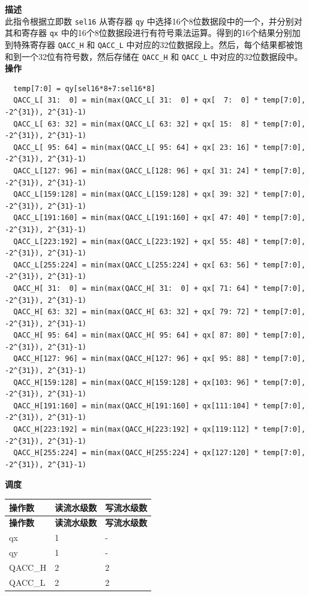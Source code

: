 \textbf{描述}\\
此指令根据立即数 \lstinline{sel16} 从寄存器 \lstinline{qy} 中选择16个8位数据段中的一个，并分别对其和寄存器 \lstinline{qx} 中的16个8位数据段进行有符号乘法运算。得到的16个结果分别加到特殊寄存器 \lstinline{QACC_H} 和 \lstinline{QACC_L} 中对应的32位数据段上。然后，每个结果都被饱和到一个32位有符号数，然后存储在 \lstinline{QACC_H} 和 \lstinline{QACC_L} 中对应的32位数据段中。\\
\textbf{操作}
\begin{lstlisting}
  temp[7:0] = qy[sel16*8+7:sel16*8]
  QACC_L[ 31:  0] = min(max(QACC_L[ 31:  0] + qx[  7:  0] * temp[7:0], -2^{31}), 2^{31}-1)
  QACC_L[ 63: 32] = min(max(QACC_L[ 63: 32] + qx[ 15:  8] * temp[7:0], -2^{31}), 2^{31}-1)
  QACC_L[ 95: 64] = min(max(QACC_L[ 95: 64] + qx[ 23: 16] * temp[7:0], -2^{31}), 2^{31}-1)
  QACC_L[127: 96] = min(max(QACC_L[128: 96] + qx[ 31: 24] * temp[7:0], -2^{31}), 2^{31}-1)
  QACC_L[159:128] = min(max(QACC_L[159:128] + qx[ 39: 32] * temp[7:0], -2^{31}), 2^{31}-1)
  QACC_L[191:160] = min(max(QACC_L[191:160] + qx[ 47: 40] * temp[7:0], -2^{31}), 2^{31}-1)
  QACC_L[223:192] = min(max(QACC_L[223:192] + qx[ 55: 48] * temp[7:0], -2^{31}), 2^{31}-1)
  QACC_L[255:224] = min(max(QACC_L[255:224] + qx[ 63: 56] * temp[7:0], -2^{31}), 2^{31}-1)
  QACC_H[ 31:  0] = min(max(QACC_H[ 31:  0] + qx[ 71: 64] * temp[7:0], -2^{31}), 2^{31}-1)
  QACC_H[ 63: 32] = min(max(QACC_H[ 63: 32] + qx[ 79: 72] * temp[7:0], -2^{31}), 2^{31}-1)
  QACC_H[ 95: 64] = min(max(QACC_H[ 95: 64] + qx[ 87: 80] * temp[7:0], -2^{31}), 2^{31}-1)
  QACC_H[127: 96] = min(max(QACC_H[127: 96] + qx[ 95: 88] * temp[7:0], -2^{31}), 2^{31}-1)
  QACC_H[159:128] = min(max(QACC_H[159:128] + qx[103: 96] * temp[7:0], -2^{31}), 2^{31}-1)
  QACC_H[191:160] = min(max(QACC_H[191:160] + qx[111:104] * temp[7:0], -2^{31}), 2^{31}-1)
  QACC_H[223:192] = min(max(QACC_H[223:192] + qx[119:112] * temp[7:0], -2^{31}), 2^{31}-1)
  QACC_H[255:224] = min(max(QACC_H[255:224] + qx[127:120] * temp[7:0], -2^{31}), 2^{31}-1)

\end{lstlisting}

\textbf{调度}\\
\begin{longtable}[c]{|l|l|l|}
    \hline
    \rowcolor{lightgray}
    \textbf{操作数} & \textbf{读流水级数} & \textbf{写流水级数} \\\hline
    \endfirsthead
    \hline
    \rowcolor{lightgray}
     \textbf{操作数} & \textbf{读流水级数} & \textbf{写流水级数} \\\hline
    \endhead
    \hline
    \endfoot

     qx & 1 & - \\\hline
     qy & 1 & - \\\hline
     QACC\_H & 2 & 2 \\\hline
     QACC\_L & 2 & 2

\end{longtable}

